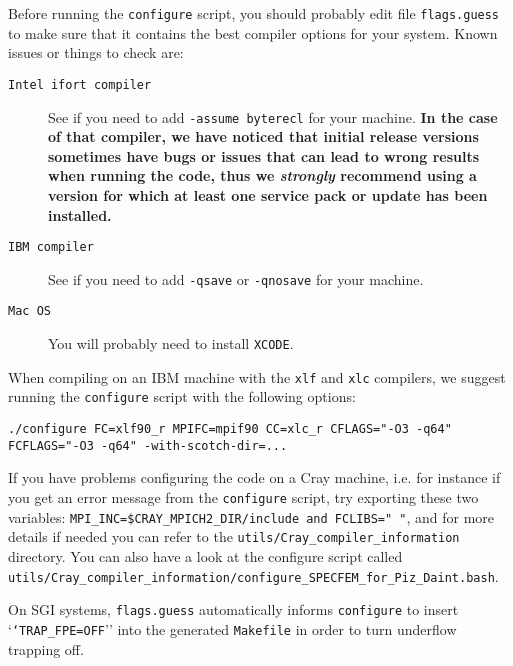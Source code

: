 Before running the \texttt{configure} script, you should probably
edit file \texttt{flags.guess} to make sure that it contains the best
compiler options for your system. Known issues or things to check
are:
\begin{description}
\item [{\texttt{Intel ifort compiler}}] See if you need to add \texttt{-assume byterecl} for your machine. \textbf{In the case of that compiler, we have noticed that initial release versions sometimes have bugs or issues that can lead to wrong results when running the code, thus we \emph{strongly} recommend using a version for which at least one service pack or update has been installed.}
\item [{\texttt{IBM compiler}}] See if you need to add \texttt{-qsave}
or \texttt{-qnosave} for your machine.
\item [{\texttt{Mac OS}}] You will probably need to install \texttt{XCODE}.
\end{description}
When compiling on an IBM machine with the \texttt{xlf} and \texttt{xlc}
compilers, we suggest running the \texttt{configure} script with the
following options:

{\footnotesize
\begin{verbatim}
./configure FC=xlf90_r MPIFC=mpif90 CC=xlc_r CFLAGS="-O3 -q64" FCFLAGS="-O3 -q64" -with-scotch-dir=...
\end{verbatim}
}

If you have problems configuring the code on a Cray machine, i.e. for instance if you get an error message from the \texttt{configure} script, try exporting these two variables:
\texttt{MPI\_INC=\${CRAY\_MPICH2\_DIR}/include and FCLIBS=" "}, and for more details if needed you can refer to the \texttt{utils/Cray\_compiler\_information} directory.
You can also have a look at the configure script called \texttt{utils/Cray\_compiler\_information/configure\_SPECFEM\_for\_Piz\_Daint.bash}.

On SGI systems, \texttt{flags.guess} automatically informs \texttt{configure}
to insert `\texttt{`TRAP\_FPE=OFF}'' into the generated \texttt{Makefile}
in order to turn underflow trapping off.\\

